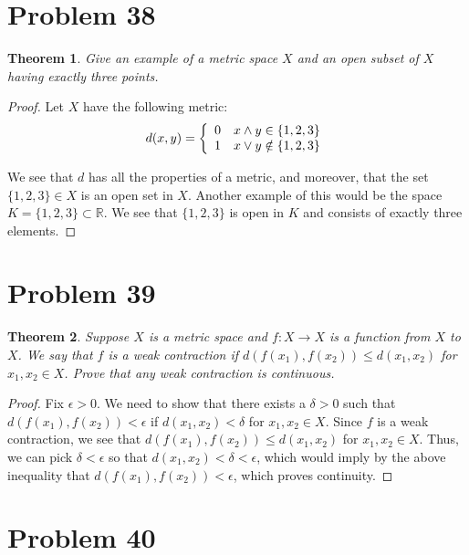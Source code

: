 \documentclass[psamsfonts]{amsart}
\newtheorem{thm}{Theorem}[section]
\theoremstyle{definition}
\theoremstyle{remark}
\numberwithin{equation}{section}
\begin{document}
\section{Problem 38}

\begin{thm}
Give an example of a metric space $X$ and an open subset of $X$ having exactly three points.
\end{thm}

\begin{proof}
Let $X$ have the following metric:
\begin{eqnarray}
d(x,y) = \left\{ \begin{array}{l l}
0 & x \wedge y \in \{1,2,3 \} \\
1 & x \vee y \notin \{1,2,3\}
\end{array} \right.
\end{eqnarray}

We see that $d$ has all the properties of a metric, and moreover, that the set $\{1,2,3 \} \in X$ is an open set in $X$. Another example of this would be the space $K = \{ 1,2,3 \} \subset \mathbb{R}$. We see that $\{1,2,3\}$ is open in $K$ and consists of exactly three elements.
\end{proof}

\section{Problem 39}

\begin{thm}
Suppose $X$ is a metric space and $f: X \to X$ is a function from $X$ to $X$. We say that $f$ is a weak contraction if $d(f(x_1),f(x_2)) \leq d(x_1, x_2)$ for $x_1, x_2 \in X$. Prove that any weak contraction is continuous.
\end{thm}

\begin{proof}
Fix $\epsilon > 0$. We need to show that there exists a $\delta > 0$ such that $d(f(x_1), f(x_2)) < \epsilon$ if $d(x_1, x_2) < \delta$ for $x_1,x_2 \in X$. Since $f$ is a weak contraction, we see that $d(f(x_1), f(x_2)) \leq d(x_1,x_2)$ for $x_1,x_2 \in X$. Thus, we can pick $\delta < \epsilon$ so that $d(x_1,x_2) < \delta < \epsilon$, which would imply by the above inequality that $d(f(x_1),f(x_2)) < \epsilon$, which proves continuity.
\end{proof}

\section{Problem 40}
\end{document}

